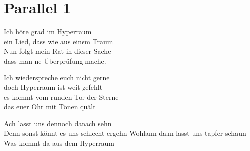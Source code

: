 
\newpage
\section{Parallel 1}
\label{sec:parallel1}
    \charaktere{\Frodo, \Legolars, \Monk, \Paul, \Spock, \Pille}

\begin{verseplay}[3em]
\s{\Spock} Ich höre grad im Hyperraum\\ ein Lied, dass wie aus einem Traum \\ Nun folgt mein Rat in dieser Sache\\ dass man ne Überprüfung mache.

\s{\Paul}  Ich wiederspreche euch nicht gerne\\ doch Hyperraum ist weit gefehlt\\ es kommt vom runden Tor der Sterne\\ das euer Ohr mit Tönen quält

\s{\Spock} Ach lasst uns dennoch danach sehn\\ Denn sonst könnt es uns schlecht ergehn
\s{\Paul} Wohlann dann lasst uns tapfer schaun\\ Was kommt da aus dem Hyperraum
\end{verseplay}


